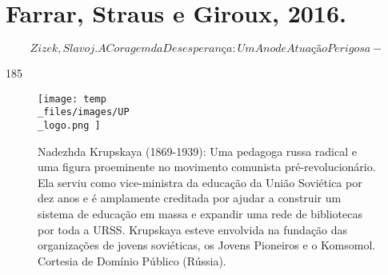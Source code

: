 \section{Farrar, Straus e Giroux, 2016.}
 \par 
\[Zizek, Slavoj. A Coragem da Desesperança: Um Ano de Atuação Perigosa-\]
 \par 
185
 \par 
\begin{figure}
	\centering
	\texttt{[image: temp\\\_files/images/UP\\\_logo.png ]}
	\caption{Nadezhda Krupskaya (1869-1939): Uma pedagoga russa radical e uma figura proeminente no movimento comunista pré-revolucionário. Ela serviu como vice-ministra da educação da União Soviética por dez anos e é amplamente creditada por ajudar a construir um sistema de educação em massa e expandir uma rede de bibliotecas por toda a URSS. Krupskaya esteve envolvida na fundação das organizações de jovens soviéticas, os Jovens Pioneiros e o Komsomol. Cortesia de Domínio Público (Rússia).}
	\label{ }
\end{figure}